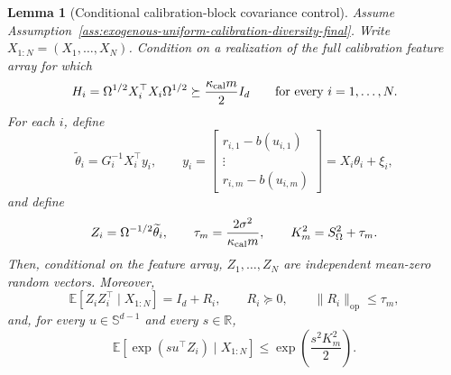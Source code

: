 \documentclass{article} %
\newtheorem{lemma}[theorem]{Lemma}
\begin{document}
\begin{lemma}[Conditional calibration-block covariance control]
\label{lem:calibration-block-covariance-control-final}
Assume Assumption~\ref{ass:exogenous-uniform-calibration-diversity-final}.
Write \(X_{1:N}=(X_1,\ldots,X_N)\).
Condition on a realization of the full calibration feature array for which
\[
H_i=\Omega^{1/2}X_i^\top X_i\Omega^{1/2}
\succeq
\frac{\kappa_{\rm cal}m}{2}I_d
\qquad
\text{for every }i=1,\ldots,N.
\]
For each \(i\), define
\[
\widetilde\theta_i=G_i^{-1}X_i^\top y_i,
\qquad
y_i=
\begin{bmatrix}
r_{i,1}-b(u_{i,1})\\
\vdots\\
r_{i,m}-b(u_{i,m})
\end{bmatrix}
=X_i\theta_i+\xi_i,
\]
and define
\[
Z_i=\Omega^{-1/2}\widetilde\theta_i,
\qquad
\tau_m=\frac{2\sigma^2}{\kappa_{\rm cal}m},
\qquad
K_m^2=S_\Omega^2+\tau_m.
\]
Then, conditional on the feature array, \(Z_1,\ldots,Z_N\) are independent
mean-zero random vectors.  Moreover,
\[
\mathbb{E}[Z_iZ_i^\top\mid X_{1:N}]=I_d+R_i,
\qquad
R_i\succeq0,
\qquad
\|R_i\|_{\mathrm{op}}\le \tau_m,
\]
and, for every \(u\in\mathbb{S}^{d-1}\) and every \(s\in\mathbb{R}\),
\[
\mathbb{E}\!\left[
\exp(su^\top Z_i)\mid X_{1:N}
\right]
\le
\exp\!\left(\frac{s^2K_m^2}{2}\right).
\]
\end{lemma}
\end{document}
